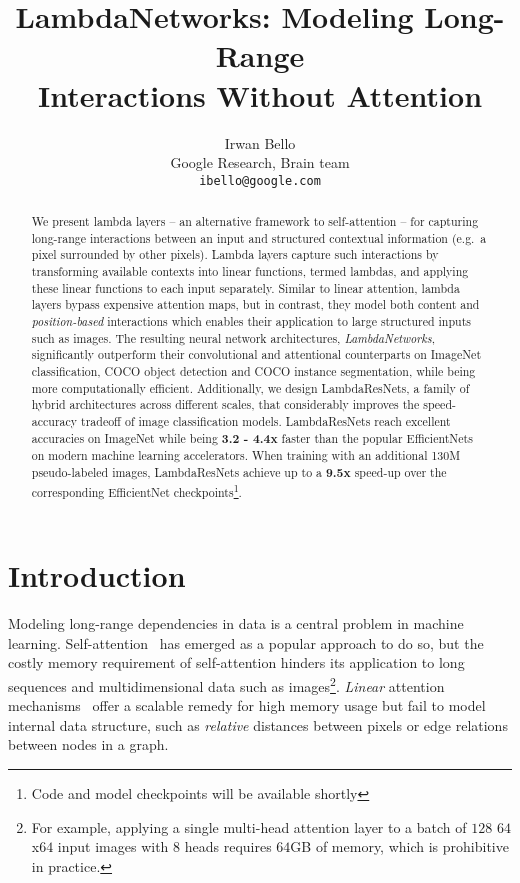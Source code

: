 \documentclass{article} \usepackage{iclr2021_conference,times}
\title{LambdaNetworks: Modeling Long-Range \\
Interactions Without Attention}
\author{
    Irwan Bello \\
    Google Research, Brain team \\
    \texttt{ibello@google.com} \\
}
\begin{document}
\maketitle

\begin{abstract}
We present lambda layers -- an alternative framework to self-attention -- for capturing long-range interactions between an input and structured contextual information (e.g.\ a pixel surrounded by other pixels).
Lambda layers capture such interactions by transforming available contexts into linear functions, termed lambdas, and applying these linear functions to each input separately.
Similar to linear attention, lambda layers bypass expensive attention maps, but in contrast, they model both content and \emph{position-based} interactions which enables their application to large structured inputs such as images.
The resulting neural network architectures, \emph{LambdaNetworks}, significantly outperform their convolutional and attentional counterparts on ImageNet classification, COCO object detection and COCO instance segmentation, while being more computationally efficient.
Additionally, we design LambdaResNets, a family of hybrid architectures across different scales, that considerably improves the speed-accuracy tradeoff of image classification models.
LambdaResNets reach excellent accuracies on ImageNet while being \textbf{3.2 - 4.4x} faster than the popular EfficientNets on modern machine learning accelerators.
When training with an additional 130M pseudo-labeled images, LambdaResNets achieve up to a \textbf{9.5x} speed-up over the corresponding EfficientNet checkpoints\footnote{Code and model checkpoints will be available shortly}.
\end{abstract}
 \newpage
\tableofcontents
\newpage
\section{Introduction \label{sec:intro}}
Modeling long-range dependencies in data is a central problem in machine learning.
Self-attention~\citep{bahdanau2014neural,vaswani2017attention} has emerged as a popular approach to do so, 
but the costly memory requirement of self-attention hinders its application to long sequences and multidimensional data such as images\footnote{For example, applying a single multi-head attention layer to a batch of $128$ $64$x$64$ input images with $8$ heads requires $64$GB of memory, which is prohibitive in practice.
}.
\emph{Linear} attention mechanisms~\citep{katharopoulos2020transformers,choromanski2020rethinking} offer a scalable remedy for high memory usage but fail to model internal data structure, such as \emph{relative} distances between pixels or edge relations between nodes in a graph.
\end{document}
